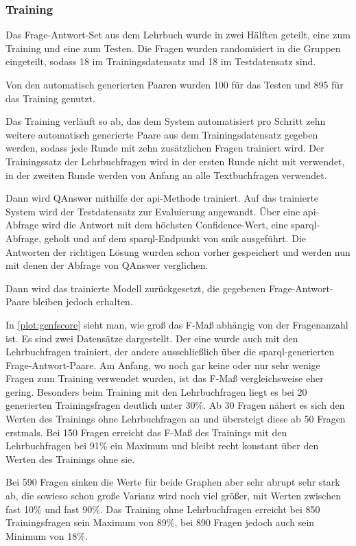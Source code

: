 \subsubsection{Training}

Das Frage-Antwort-Set aus dem Lehrbuch wurde in zwei Hälften geteilt, eine zum Training und eine zum Testen.
Die Fragen wurden randomisiert in die Gruppen eingeteilt, sodass 18 im Trainingsdatensatz und 18 im Testdatensatz sind.

Von den automatisch generierten Paaren wurden 100 für das Testen und 895 für das Training genutzt.

Das Training verläuft so ab, das dem System automatisiert pro Schritt zehn weitere automatisch generierte Paare aus dem Trainingsdatensatz gegeben werden,
sodass jede Runde mit zehn zusätzlichen Fragen trainiert wird.
Der Trainingssatz der Lehrbuchfragen wird in der ersten Runde nicht mit verwendet,
in der zweiten Runde werden von Anfang an alle Textbuchfragen verwendet.

Dann wird QAnswer mithilfe der \ac{api}-Methode trainiert.
Auf das trainierte System wird der Testdatensatz zur Evaluierung angewandt.
Über eine \ac{api}-Abfrage wird die Antwort mit dem höchsten Confidence-Wert, eine \ac{sparql}-Abfrage, geholt und auf dem \ac{sparql}-Endpunkt von \ac{snik} ausgeführt.
Die Antworten der richtigen Lösung wurden schon vorher gespeichert und werden nun mit denen der Abfrage von QAnswer verglichen.

Dann wird das trainierte Modell zurückgesetzt, die gegebenen Frage-Antwort-Paare bleiben jedoch erhalten.

In \cref{plot:genfscore} sieht man, wie groß das F-Maß abhängig von der Fragenanzahl ist.
Es sind zwei Datensätze dargestellt.
Der eine wurde auch mit den Lehrbuchfragen trainiert, der andere ausschließlich über die \ac{sparql}-generierten Frage-Antwort-Paare.
Am Anfang, wo noch gar keine oder nur sehr wenige Fragen zum Training verwendet wurden, ist das F-Maß vergleichsweise eher gering.
Besonders beim Training mit den Lehrbuchfragen liegt es bei 20 generierten Trainingsfragen deutlich unter 30\%.
Ab 30 Fragen nähert es sich den Werten des Trainings ohne Lehrbuchfragen an und übersteigt diese ab 50 Fragen erstmals.
Bei 150 Fragen erreicht das F-Maß des Trainings mit den Lehrbuchfragen bei 91\% ein Maximum und bleibt recht konstant über den Werten des Trainings ohne sie.

Bei 590 Fragen sinken die Werte für beide Graphen aber sehr abrupt sehr stark ab, die sowieso schon große Varianz wird noch viel größer,
mit Werten zwischen fast 10\% und fast 90\%.
Das Training ohne Lehrbuchfragen erreicht bei 850 Trainingsfragen sein Maximum von 89\%, bei 890 Fragen jedoch auch sein Minimum von 18\%.

